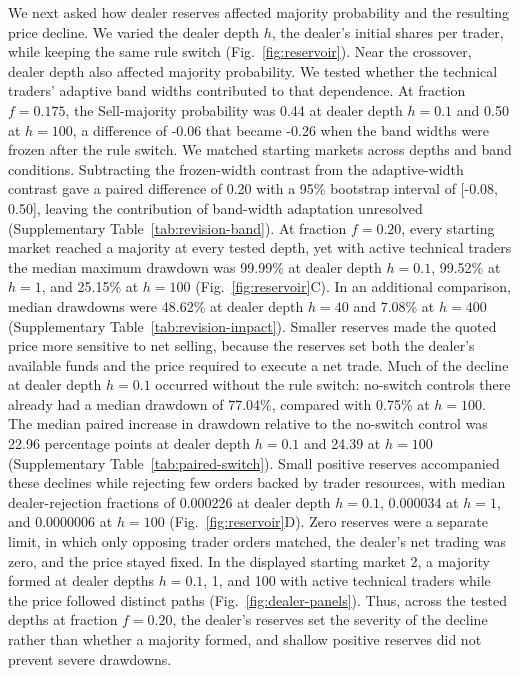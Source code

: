 We next asked how dealer reserves affected majority probability and
the resulting price decline. We varied the dealer depth $h$, the dealer's initial shares per
trader, while keeping the same rule switch (Fig.~\ref{fig:reservoir}). Near the crossover, dealer depth also affected majority probability.
We tested whether the technical traders' adaptive band widths contributed
to that dependence. At fraction $f=0.175$, the Sell-majority
probability was 0.44 at dealer depth $h=0.1$ and 0.50 at $h=100$, a
difference of -0.06 that became -0.26 when the band widths were frozen
after the rule switch. We matched starting markets across depths and band conditions.
Subtracting the frozen-width contrast from the adaptive-width contrast
gave a paired difference of 0.20 with a 95\% bootstrap interval of
[-0.08, 0.50], leaving the contribution of band-width adaptation unresolved (Supplementary Table~\ref{tab:revision-band}). At fraction
$f=0.20$, every starting market reached a majority at every tested
depth, yet with active technical traders the median maximum drawdown
was 99.99\% at dealer depth $h=0.1$, 99.52\% at $h=1$, and 25.15\% at $h=100$
(Fig.~\ref{fig:reservoir}C). In an additional comparison, median drawdowns were
48.62\% at dealer depth $h=40$ and 7.08\% at $h=400$
(Supplementary Table~\ref{tab:revision-impact}). Smaller reserves made the quoted price
more sensitive to net selling, because the reserves set both the
dealer's available funds and the price required to execute a net trade.
Much of the decline at dealer depth $h=0.1$ occurred without the rule
switch: no-switch controls there already had a median drawdown of
77.04\%, compared with 0.75\% at $h=100$. The median paired
increase in drawdown relative to the no-switch control was 22.96 percentage points at dealer depth
$h=0.1$ and 24.39 at $h=100$ (Supplementary Table~\ref{tab:paired-switch}).
Small positive reserves accompanied these declines while rejecting few
orders backed by trader resources, with median dealer-rejection fractions of 0.000226 at dealer
depth $h=0.1$, 0.000034 at $h=1$, and 0.0000006 at $h=100$
(Fig.~\ref{fig:reservoir}D). Zero reserves were a separate limit, in which only
opposing trader orders matched, the dealer's net trading was zero, and
the price stayed fixed. In the
displayed starting market 2, a majority formed at dealer depths
$h=0.1$, 1, and 100 with active technical traders while the price followed distinct
paths (Fig.~\ref{fig:dealer-panels}). Thus, across the tested depths at fraction $f=0.20$, the dealer's
reserves set the severity of the decline rather than whether a majority
formed, and shallow positive reserves did not prevent severe drawdowns.

